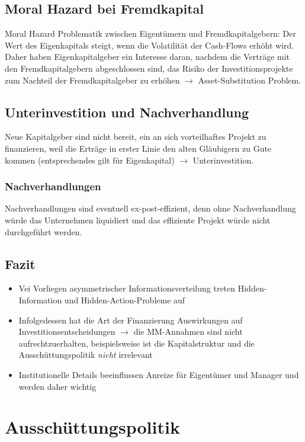 \subsection{Moral Hazard bei Fremdkapital}
Moral Hazard Problematik zwischen Eigentümern und Fremdkapitalgebern: Der Wert des Eigenkapitals steigt, wenn die Volatilität der Cash-Flows erhöht wird. Daher haben Eigenkapitalgeber ein Interesse daran, nachdem die Verträge mit den Fremdkapitalgebern abgeschlossen sind, das Risiko der Investitionsprojekte zum Nachteil der Fremdkapitalgeber zu erhöhen $\rightarrow$ Asset-Substitution Problem.


\subsection{Unterinvestition und Nachverhandlung}
Neue Kapitalgeber sind nicht bereit, ein an sich vorteilhaftes Projekt zu finanzieren, weil die Erträge in erster Linie den alten Gläubigern zu Gute kommen (entsprechendes gilt für Eigenkapital) $\rightarrow$ Unterinvestition.

\subsubsection{Nachverhandlungen}
Nachverhandlungen sind eventuell ex-post-effizient, denn ohne Nachverhandlung würde das Unternehmen liquidiert und das effiziente Projekt würde nicht durchgeführt werden.


\subsection{Fazit}
\begin{itemize}
	\item Vei Vorliegen asymmetrischer Informationsverteilung treten Hidden-Information und Hidden-Action-Probleme auf
	\item Infolgedessen hat die Art der Finanzierung Auswirkungen auf Investitionsentscheidungen $\rightarrow$ die MM-Annahmen sind nicht aufrechtzuerhalten, beispielsweise ist die Kapitalstruktur und die Ausschüttungspolitik \textit{nicht} irrelevant
	\item Institutionelle Details beeinflussen Anreize für Eigentümer und Manager und werden daher wichtig
\end{itemize}



\section{Ausschüttungspolitik}

